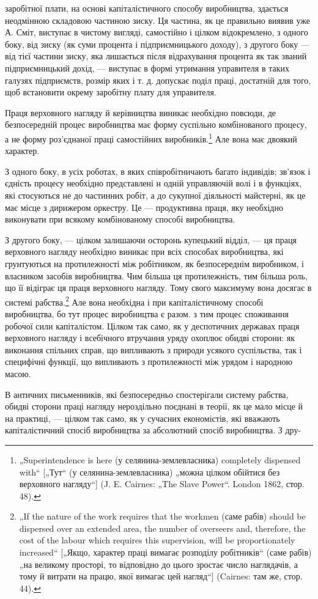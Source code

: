 заробітної плати, на основі капіталістичного способу виробництва,
здається неодмінною складовою частиною зиску. Ця частина, як
це правильно виявив уже А. Сміт, виступає в чистому вигляді,
самостійно і цілком відокремлено, з одного боку, від зиску (як
суми процента і підприємницького доходу), з другого боку —
від тієї частини зиску, яка лишається після відрахування процента
як так званий підприємницький дохід, — виступає в формі утримання
управителя в таких галузях підприємств, розмір яких
і т. д. допускає поділ праці, достатній для того, щоб встановити
окрему заробітну плату для управителя.

Праця верховного нагляду й керівництва виникає необхідно
повсюди, де безпосередній процес виробництва має форму суспільно
комбінованого процесу, а не форму роз’єднаної праці
самостійних виробників.\footnote{
„Superintendence is here (у селянина-землевласника) completely dispensed
with“ [„Тут“ (у селянина-землевласника) „можна цілком обійтися без верховного
нагляду“] (J. E. Cairnes: „The Slave Power“. London 1862, стор. 48).
} Але вона має двоякий характер.

З одного боку, в усіх роботах, в яких співробітничають багато
індивідів; зв’язок і єдність процесу необхідно представлені н
одній управляючій волі і в функціях, які стосуються не до частинних
робіт, а до сукупної діяльності майстерні, як це має місце
з дирижером оркестру. Це — продуктивна праця, яку необхідно
виконувати при всякому комбінованому способі виробництва.

З другого боку, — цілком залишаючи осторонь купецький
відділ, — ця праця верховного нагляду необхідно виникає при
всіх способах виробництва, які грунтуються на протилежності
між робітником, як безпосереднім виробником, і власником засобів
виробництва. Чим більша ця протилежність, тим більша
роль, що її відіграє ця праця верховного нагляду. Тому свого
максимуму вона досягає в системі рабства.\footnote{
„If the nature of the work requires that the workmen (саме рабів) should
be dispersed over an extended area, the number of overseers and, therefore, the
cost of the labour which requires this supervision, will be proportionately increased“
[„Якщо, характер праці вимагає розподілу робітників“ (саме рабів) „на
великому просторі, то відповідно до цього зростає число наглядачів, а тому й
витрати на працю, якої вимагає цей нагляд“] (Cairnes: там же, стор. 44).
} Але вона необхідна
і при капіталістичному способі виробництва, бо тут процес
виробництва є разом. з тим процес споживання робочої
сили капіталістом. Цілком так само, як у деспотичних державах
праця верховного нагляду і всебічного втручання уряду
охоплює обидві сторони: як виконання спільних справ, що випливають
з природи усякого суспільства, так і специфічні функції,
що випливають з протилежності між урядом і народною
масою.

В античних письменників, які безпосередньо спостерігали
систему рабства, обидві сторони праці нагляду нероздільно поєднані
в теорії, як це мало місце й на практиці, — цілком так
само, як у сучасних економістів, які вважають капіталістичний
спосіб виробництва за абсолютний спосіб виробництва. З дру-